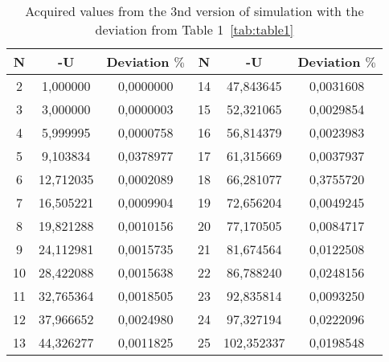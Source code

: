 \documentclass{scrartcl}
\begin{document}
\begin{table} [h] \label{tab:table4}
    \centering
 
    \begin{tabular}{|c|c|c|c|c|c|}
    \hline
   N      &  -U        &  Deviation $\%$ &  N   &  -U   &  Deviation $\%$\\
   \hline
    2     &  1,000000  &  0,0000000  &14  &  47,843645 & 0,0031608\\
    3     &  3,000000  &  0,0000003  &15  &  52,321065 & 0,0029854\\
    4     &  5,999995  &  0,0000758  &16  &  56,814379 & 0,0023983\\
    5     &  9,103834  &  0,0378977  &17  &  61,315669 & 0,0037937\\
    6     &  12,712035 &  0,0002089  &18  &  66,281077 & 0,3755720\\
    7     &  16,505221 &  0,0009904  &19  &  72,656204 & 0,0049245\\
    8     &  19,821288 &  0,0010156  &20  &  77,170505 & 0,0084717\\
    9     &  24,112981 &  0,0015735  &21  &  81,674564 & 0,0122508\\
    10    &  28,422088 &  0,0015638  &22  &  86,788240 & 0,0248156\\
    11    &  32,765364 &  0,0018505  &23  &  92,835814 & 0,0093250\\
    12    &  37,966652 &  0,0024980  &24  &  97,327194 & 0,0222096\\
    13    &  44,326277 &  0,0011825  &25  &  102,352337 & 0,0198548\\      \hline           
    \end{tabular}
    \caption{Acquired values from the 3nd version of simulation with the deviation from Table 1~\ref{tab:table1}}
\end{table}
\end{document}
